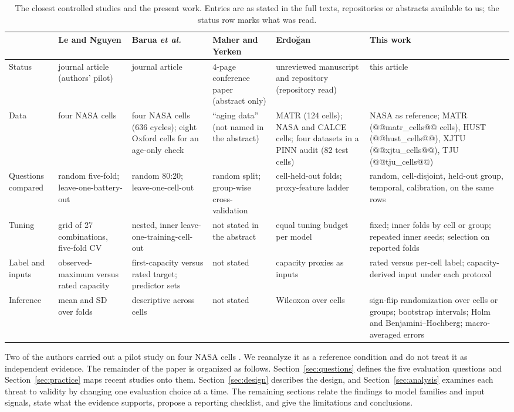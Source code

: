 \documentclass{ieeeaccess}
\begin{document}
\begin{table}[!t]
\centering
\caption{The closest controlled studies and the present work. Entries are as stated in the full texts, repositories or abstracts available to us; the status row marks what was read.}
\label{tab:novelty}
\footnotesize
\begin{tabular}{p{}p{}p{}p{}p{}p{}}
\toprule
 & Le and Nguyen \cite{le2026} & Barua \textit{et al.} \cite{barua2026} & Maher and Yerken \cite{maher2025} & Erdo\u{g}an \cite{erdogan2026} & This work \\
\midrule
Status & journal article (authors' pilot) & journal article & 4-page conference paper (abstract only) & unreviewed manuscript and repository (repository read) & this article \\
Data & four NASA cells & four NASA cells (636 cycles); eight Oxford cells for an age-only check & ``aging data'' (not named in the abstract) & MATR (124 cells); NASA and CALCE cells; four datasets in a PINN audit (82 test cells) & NASA as reference; MATR (@@matr_cells@@ cells), HUST (@@hust_cells@@), XJTU (@@xjtu_cells@@), TJU (@@tju_cells@@) \\
Questions compared & random five-fold; leave-one-battery-out & random 80:20; leave-one-cell-out & random split; group-wise cross-validation & cell-held-out folds; proxy-feature ladder & random, cell-disjoint, held-out group, temporal, calibration, on the same rows \\
Tuning & grid of 27 combinations, five-fold CV & nested, inner leave-one-training-cell-out & not stated in the abstract & equal tuning budget per model & fixed; inner folds by cell or group; repeated inner seeds; selection on reported folds \\
Label and inputs & observed-maximum versus rated capacity & first-capacity versus rated target; predictor sets & not stated & capacity proxies as inputs & rated versus per-cell label; capacity-derived input under each protocol \\
Inference & mean and SD over folds & descriptive across cells & not stated & Wilcoxon over cells & sign-flip randomization over cells or groups; bootstrap intervals; Holm and Benjamini--Hochberg; macro-averaged errors \\
\bottomrule
\end{tabular}
\end{table}

Two of the authors carried out a pilot study on four NASA cells \cite{le2026}. We reanalyze it as a reference condition and do not treat it as independent evidence. The remainder of the paper is organized as follows. Section~\ref{sec:questions} defines the five evaluation questions and Section~\ref{sec:practice} maps recent studies onto them. Section~\ref{sec:design} describes the design, and Section~\ref{sec:analysis} examines each threat to validity by changing one evaluation choice at a time. The remaining sections relate the findings to model families and input signals, state what the evidence supports, propose a reporting checklist, and give the limitations and conclusions.
\end{document}
